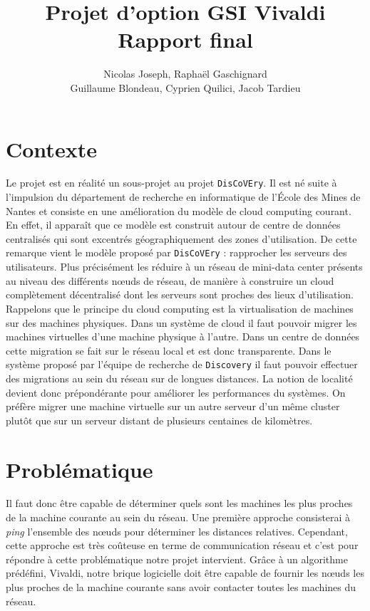 \documentclass[11pt,a4paper]{article}
\title{Projet d'option GSI Vivaldi \\ Rapport final}
\author{Nicolas Joseph, Raphaël Gaschignard\\ Guillaume Blondeau, Cyprien Quilici, Jacob Tardieu}
\begin{document}
\maketitle
\section{Contexte}

Le projet est en réalité un sous-projet au projet \texttt{DisCoVEry}. Il est né suite à l'impulsion du département de recherche en informatique de l'École des Mines de Nantes et consiste en une amélioration du modèle de cloud computing courant. En effet, il apparaît que ce modèle est construit autour de centre de données centralisés qui sont excentrés géographiquement des zones d’utilisation. De cette remarque vient  le modèle proposé par \texttt{DisCoVEry} : rapprocher les serveurs des utilisateurs. Plus précisément les réduire à un réseau de mini-data center présents au niveau des différents n\oe uds de réseau, de manière à construire un cloud complètement décentralisé dont les serveurs sont proches des lieux d'utilisation.\\

Rappelons que le principe du cloud computing est la virtualisation de machines sur des machines physiques. Dans un système de cloud il faut pouvoir migrer les machines virtuelles d'une machine physique à l'autre. Dans un centre de données cette migration se fait sur le réseau local et est donc transparente. Dans le système proposé par l'équipe de recherche de \texttt{Discovery} il faut pouvoir effectuer des migrations au sein du réseau sur de longues distances. La notion de localité devient donc prépondérante pour améliorer les performances du systèmes. On préfère migrer une machine virtuelle sur un autre serveur d'un même cluster plutôt que sur un serveur distant de plusieurs centaines de kilomètres. 

\section{Problématique}
Il faut donc être capable de déterminer quels sont les machines les plus proches de la machine courante au sein du réseau. Une première approche consisterai à \textit{ping} l'ensemble des n\oe uds pour déterminer les distances relatives. Cependant, cette approche est très coûteuse en terme de communication réseau et c'est pour répondre à cette problématique notre projet intervient. Grâce à un algorithme prédéfini, Vivaldi, notre brique logicielle doit être capable de fournir les n\oe uds les plus proches de la machine courante sans avoir contacter toutes les machines du réseau.\\
\end{document}
